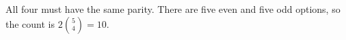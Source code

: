All four must have the same parity. There are five even and five odd options, so the count is $2\binom54=\boxed{10}$.
